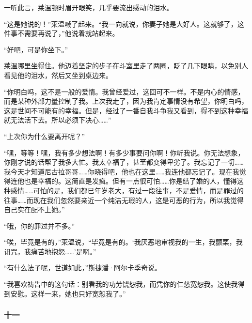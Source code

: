 \par 一听此言，莱温顿时眉开眼笑，几乎要流出感动的泪水。
\par “这是她说的！”莱温喊了起来。“我一向就说，你妻子她是大好人。这就够了，这件事不需要再说了，”他说着就站起来。
\par “好吧，可是你坐下。”
\par 莱温哪里坐得住。他迈着坚定的步子在斗室里走了两圈，眨了几下眼睛，以免别人看见他的泪水，然后又坐到桌边来。
\par “你明白吗，这不是一般的爱情。我曾经爱过，这回可不一样。不是内心的情感，而是某种外部力量控制了我。上次我走了，因为我肯定事情没有希望，你明白吗，这是世间不可能有的幸福。但是，经过了一番自我斗争我又看到，得不到这种幸福就无法活下去。所以必须下决心……”
\par “上次你为什么要离开呢？”
\par “嘿，等等！嘿，我有多少想法啊！有多少事要问你啊！你听我说。你无法想象，你刚才说的话帮了我多大忙。我太幸福了，甚至都变得卑劣了。我忘记了一切……我今天才知道尼古拉哥哥……你晓得吧，他也在这里……我连他都忘记了。现在我觉得连他也是幸福的。这简直是发疯。但有一点很可怕……你是结了婚的人，懂得这种感情……可怕的是，我们都已年岁老大，有过一段往事，不是爱情，而是罪过的往事……而现在我们忽然要亲近一个纯洁无瑕的人，这是可恶的行为，所以我觉得自己实在配不上她。”
\par “哦，你的罪过并不多。”
\par “唉，毕竟是有的，”莱温说，“毕竟是有的。‘我厌恶地审视我的一生，我颤栗，我诅咒，我痛苦地抱怨……’是啊。”
\par “有什么法子呢，世道如此，”斯捷潘·阿尔卡季奇说。
\par “我喜欢祷告中的这句话：别看我的功劳饶恕我，而凭你的仁慈宽恕我。这使我得到安慰。这样一来，她也只好宽恕我了。”


\subsubsection*{十一}

